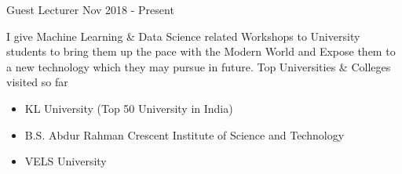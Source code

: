 \vspace{1mm}
\begin{cventries}
    \cventry
    {}
    {Guest Lecturer}
    {Nov 2018 - Present}
    {}
    {I give Machine Learning \& Data Science related Workshops to University students to bring them up the pace with the Modern World and Expose them to a new technology which they may pursue in future. Top Universities \& Colleges visited so far
        \begin{itemize}
        \item KL University (Top 50 University in India)
        \item B.S. Abdur Rahman Crescent Institute of Science and Technology
        \item VELS University
    \end{itemize}}
\end{cventries}
